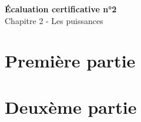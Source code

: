 \documentclass[14pt, a4paper]{article}
\newcommand{\doctitle}{Écaluation certificative n°2}
\newcommand{\docsubtitle}{Chapitre 2 - Les puissances}
\begin{document}
\pagestyle{fancy}
\thispagestyle{firstpage}
\begin{center}
    {\LARGE \textbf{\doctitle} \\[1em]}
    {\large \docsubtitle}
\end{center}

\newpage

\thispagestyle{otherpages}
\section{Première partie}




\section{Deuxème partie}

\end{document}
